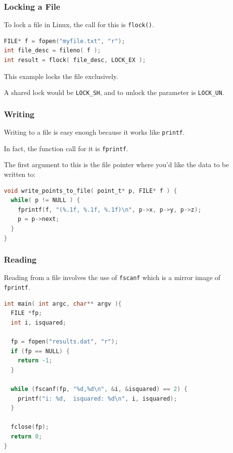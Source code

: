 \begin{frame}[fragile]
	\frametitle{Locking a File}
	To lock a file in Linux, the call for this is \texttt{flock()}.

	\begin{lstlisting}[language=C]
FILE* f = fopen("myfile.txt", "r");
int file_desc = fileno( f );
int result = flock( file_desc, LOCK_EX );
\end{lstlisting}

	This example locks the file exclusively.

	A shared lock would be \texttt{LOCK\_SH}, and to unlock the parameter is \texttt{LOCK\_UN}.

\end{frame}


\begin{frame}[fragile]
	\frametitle{Writing}

	Writing to a file is easy enough because it works like \texttt{printf}.

	In fact, the function call for it is \texttt{fprintf}.

	The first argument to this is the file pointer where you'd like the data to be written to:

	\begin{lstlisting}[language=C]
void write_points_to_file( point_t* p, FILE* f ) {
  while( p != NULL ) {
    fprintf(f, "(%.1f, %.1f, %.1f)\n", p->x, p->y, p->z);
    p = p->next;
  }
}
\end{lstlisting}
\end{frame}


\begin{frame}[fragile]
	\frametitle{Reading}

	Reading from a file involves the use of \texttt{fscanf} which is a mirror image of \texttt{fprintf}.


	\begin{lstlisting}[language=C]
int main( int argc, char** argv ){
  FILE *fp;
  int i, isquared;
   
  fp = fopen("results.dat", "r");
  if (fp == NULL) {
    return -1;
  }
   
  while (fscanf(fp, "%d,%d\n", &i, &isquared) == 2) {
    printf("i: %d,  isquared: %d\n", i, isquared);
  }
  
  fclose(fp);
  return 0;
}
\end{lstlisting}

\end{frame}




